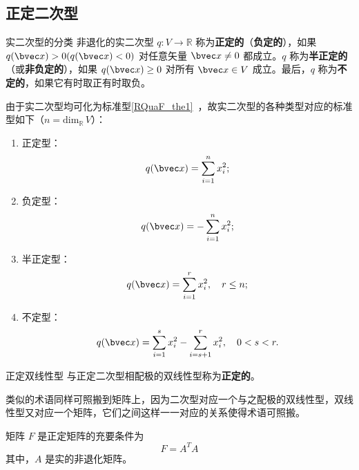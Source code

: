 
\begin{issues}
\end{issues}

\subsection{正定二次型}
\begin{definition}{实二次型的分类}
非退化的实二次型 $q:V\rightarrow\mathbb R$ 称为\textbf{正定的}（\textbf{负定的}），如果 $q(\bvec x)>0(q(\bvec x)<0)$ 对任意矢量 $\bvec x\neq0$ 都成立。$q$ 称为\textbf{半正定的}（或\textbf{非负定的}），如果 $q(\bvec x)\geq0$ 对所有 $\bvec x\in V$ 成立。最后，$q$ 称为\textbf{不定的}，如果它有时取正有时取负。
\end{definition}
由于实二次型均可化为标准型\autoref{RQuaF_the1}~，故实二次型的各种类型对应的标准型如下（$n=\mathrm{dim}_\mathbb R \,V$）：
\begin{enumerate}
\item 正定型：\begin{equation}\label{DeQua_eq1}
q(\bvec x)=\sum_{i=1}^n x_i^2;
\end{equation}
\item 负定型：\begin{equation}
q(\bvec x)=-\sum_{i=1}^n x_i^2;
\end{equation}
\item 半正定型：\begin{equation}
q(\bvec x)=\sum_{i=1}^r x_i^2,\quad r\leq n;
\end{equation}
\item 不定型：\begin{equation}
q(\bvec x)=\sum_{i=1}^s x_i^2-\sum_{i=s+1}^r x_i^2,\quad0<s< r.
\end{equation}
\end{enumerate}
\begin{definition}{正定双线性型}\label{DeQua_def1}
与正定二次型相配极的双线性型称为\textbf{正定的}。
\end{definition}
类似的术语同样可照搬到矩阵上，因为二次型对应一个与之配极的双线性型，双线性型又对应一个矩阵，它们之间这样一一对应的关系使得术语可照搬。
\begin{theorem}{}
矩阵 $F$ 是正定矩阵的充要条件为
\begin{equation}
F=A^TA
\end{equation}
其中，$A$ 是实的非退化矩阵。
\end{theorem}
